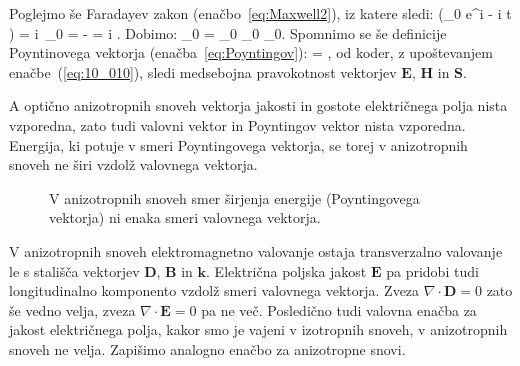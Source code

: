 Poglejmo še Faradayev zakon (enačbo~\ref{eq:Maxwell2}), iz katere sledi:
\beq
\nabla \times \left(_0 e^{i\cdot {} - i \omega t} \right) = 
i~\times {}_0 = -  = i \omega {}.
\label{eq:10_009}
\eeq
Dobimo:
\beq
{}\times {}_0 = \omega \mu_0  \qquad \Longrightarrow \qquad {}_0 \perp {}_0.
\label{eq:10_010}
\eeq
Spomnimo se še definicije Poyntinovega vektorja (enačba~\ref{eq:Poyntingov}):
\beq
{} =  \times {},
\label{eq:10_011}
\eeq
od koder, z upoštevanjem enačbe~(\ref{eq:10_010}), sledi medsebojna pravokotnost vektorjev $\mathbf{E}$, $\mathbf{H}$ in 
$\mathbf{S}$. 

A optično anizotropnih snoveh vektorja jakosti in gostote električnega polja nista vzporedna, zato tudi 
valovni vektor in Poyntingov vektor nista vzporedna. Energija, ki potuje v smeri Poyntingovega vektorja, se
torej v anizotropnih snoveh ne širi vzdolž valovnega vektorja. 
\begin{figure}[!h]
\centering
\def\svgwidth{90truemm} 
%
\caption{V anizotropnih snoveh smer širjenja energije (Poyntingovega 
vektorja) ni enaka smeri valovnega vektorja.}
\label{fig:10_koti}
\end{figure}

V anizotropnih snoveh elektromagnetno valovanje ostaja transverzalno
valovanje le s stališča vektorjev $\mathbf{D}$, $\mathbf{B}$ in 
$\mathbf{k}$. Električna poljska jakost $\mathbf{E}$ pa pridobi 
tudi longitudinalno komponento vzdolž smeri valovnega vektorja. 
Zveza $\nabla \cdot \mathbf{D} = 0$ zato še vedno velja, zveza 
$\nabla \cdot \mathbf{E} = 0$ pa ne več. Posledično tudi valovna
enačba za jakost električnega polja, kakor smo je vajeni
v izotropnih snoveh, v anizotropnih snoveh ne velja. Zapišimo 
analogno enačbo za anizotropne snovi. 


